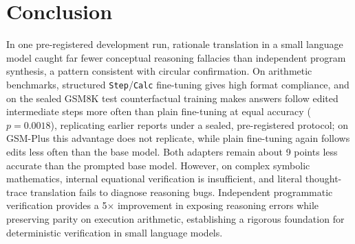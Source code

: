 \documentclass[11pt,a4paper]{article}
\begin{document}
\section{Conclusion}
In one pre-registered development run, rationale translation in a small language model caught far fewer conceptual reasoning fallacies than independent program synthesis, a pattern consistent with circular confirmation. On arithmetic benchmarks, structured \texttt{Step}/\texttt{Calc} fine-tuning gives high format compliance, and on the sealed GSM8K test counterfactual training makes answers follow edited intermediate steps more often than plain fine-tuning at equal accuracy ($p = 0.0018$), replicating earlier reports \citep{swaroop2025lift,lobo2024impact} under a sealed, pre-registered protocol; on GSM-Plus this advantage does not replicate, while plain fine-tuning again follows edits less often than the base model. Both adapters remain about 9 points less accurate than the prompted base model. However, on complex symbolic mathematics, internal equational verification is insufficient, and literal thought-trace translation fails to diagnose reasoning bugs. Independent programmatic verification provides a 5$\times$ improvement in exposing reasoning errors while preserving parity on execution arithmetic, establishing a rigorous foundation for deterministic verification in small language models.



\end{document}
